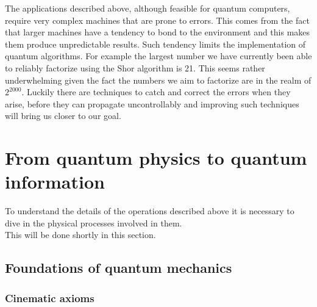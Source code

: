 \documentclass{article}
\begin{document}
\vspace{10pt}

The applications described above, although feasible for quantum computers, require
very complex machines that are prone to errors.
This comes from the fact that larger machines have a tendency to bond to the
environment and this makes them produce unpredictable results.
Such tendency limits the implementation of quantum algorithms.
For example the largest number we have currently been able to reliably factorize
using the Shor algorithm is 21.
This seems rather underwhelming given the fact the numbers we aim to factorize
are in the realm of $2^{2000}$.
Luckily there are techniques to catch and correct the errors
when they arise, before they can propagate uncontrollably and improving
such techniques will bring us closer to our goal.



\section{From quantum physics to quantum information}

To understand the details of the operations described above it is
necessary to dive in the physical processes involved in them.\\
This will be done shortly in this section.

\newpage

\subsection{Foundations of quantum mechanics}

\subsubsection{Cinematic axioms}
\end{document}
